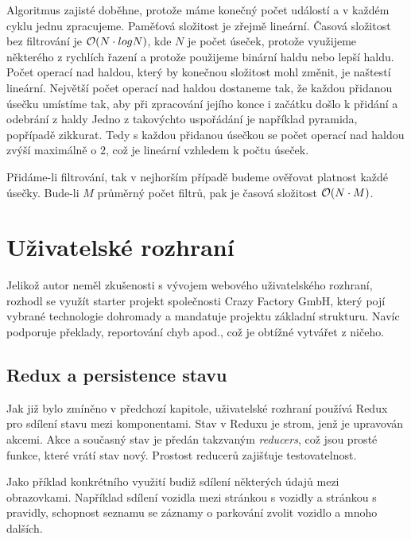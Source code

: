 \noindent
Algoritmus zajisté doběhne, protože máme konečný počet událostí a v každém cyklu jednu zpracujeme.
Paměťová složitost je zřejmě lineární. Časová složitost bez filtrování je ${\cal O}(N\cdot{logN})$, kde $N$ je 
počet úseček, protože
využijeme některého z rychlích řazení a protože použijeme binární haldu nebo lepší haldu. Počet operací nad haldou,
který by konečnou složitost mohl změnit, je naštestí lineární. Největší počet operací nad haldou dostaneme tak, že
každou přidanou úsečku umístíme tak, aby při zpracování jejího konce i začátku došlo k přidání a odebrání z haldy
Jedno z takovýchto uspořádání je například pyramida, popřípadě zikkurat.
Tedy s každou přidanou úsečkou se počet operací nad haldou zvýší maximálně o $2$, což je lineární vzhledem k počtu úseček.

Přidáme-li filtrování, tak v nejhorším případě budeme ověřovat platnost každé úsečky. Bude-li $M$ průměrný počet
filtrů, pak je časová složitost ${\cal O}(N\cdot{M})$. 

\section{Uživatelské rozhraní}

\noindent
Jelikož autor neměl zkušenosti s vývojem webového uživatelského rozhraní, rozhodl se využít starter projekt
společnosti Crazy Factory GmbH, který pojí vybrané technologie dohromady a mandatuje projektu základní strukturu.
Navíc podporuje překlady, reportování chyb apod., což je obtížné vytvářet z ničeho. \citep[viz][]{CFProj}

\subsection{Redux a persistence stavu}

\noindent
Jak již bylo zmíněno v předchozí kapitole, uživatelské rozhraní používá Redux pro sdílení stavu mezi komponentami.
Stav v Reduxu je strom, jenž je upravován akcemi. Akce a současný stav je předán takzvaným \textit{reducers}, což jsou prosté funkce,
které vrátí stav nový. \citep[viz][]{ReduxCore} Prostost reducerů zajišťuje testovatelnost.

Jako příklad konkrétního využití budiž sdílení některých údajů mezi obrazovkami.
Například sdílení vozidla mezi stránkou s vozidly a stránkou s pravidly, schopnost seznamu se záznamy o parkování
zvolit vozidlo a mnoho dalších.

